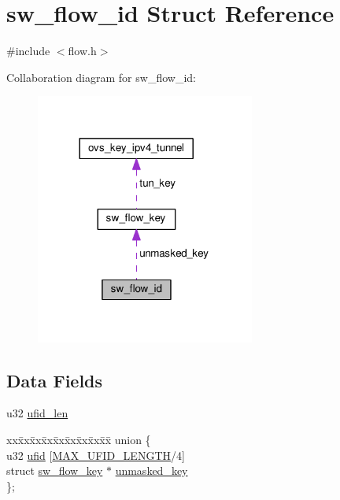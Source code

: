 \hypertarget{structsw__flow__id}{}\section{sw\+\_\+flow\+\_\+id Struct Reference}
\label{structsw__flow__id}


{\ttfamily \#include $<$flow.\+h$>$}



Collaboration diagram for sw\+\_\+flow\+\_\+id\+:
\nopagebreak
\begin{figure}[H]
\begin{center}
\leavevmode
\includegraphics[width=204pt]{structsw__flow__id__coll__graph}
\end{center}
\end{figure}
\subsection*{Data Fields}
\begin{DoxyCompactItemize}
\item 
u32 \hyperlink{structsw__flow__id_a7cfead96fedf295e55d6a17857adfbf5}{ufid\+\_\+len}
\item 
\begin{tabbing}
xx\=xx\=xx\=xx\=xx\=xx\=xx\=xx\=xx\=\kill
union \{\\
\>u32 \hyperlink{structsw__flow__id_a22ce2b1fed980149931fbccb05750f3e}{ufid} \mbox{[}\hyperlink{flow_8h_a5cc1c8e559536cddce9d468214805527}{MAX\_UFID\_LENGTH}/4\mbox{]}\\
\>struct \hyperlink{structsw__flow__key}{sw\_flow\_key} $\ast$ \hyperlink{structsw__flow__id_a5d62dce79569cb8c25a43f4039e5df3c}{unmasked\_key}\\
\}; \\

\end{tabbing}\end{DoxyCompactItemize}


